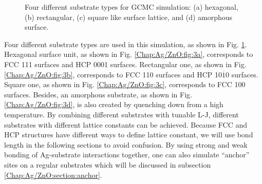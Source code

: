\begin{figure}[!ht]
  \label{Chap:Ag/ZnO:fig:3d}
\caption[Four different substrate types for GCMC simulation.]{Four different substrate types for GCMC simulation: (a) hexagonal, (b) rectangular, (c) square like surface lattice, and (d) amorphous surface. }
  \label{Chap:Ag/ZnO:fig3}
\end{figure}
\endgroup

Four different substrate types are used in this simulation, as shown in Fig. \ref{Chap:Ag/ZnO:fig3}. Hexagonal surface unit, as shown in Fig. \ref{Chap:Ag/ZnO:fig:3a}, corresponds to \ac{FCC} {111} surfaces and \ac{HCP} {0001} surfaces. Rectangular one, as shown in Fig. \ref{Chap:Ag/ZnO:fig:3b}, corresponds to \ac{FCC} {110} surfaces and \ac{HCP} {10$\overline{1}$0} surfaces. Square one, as shown in Fig. \ref{Chap:Ag/ZnO:fig:3c}, corresponds to \ac{FCC} {100} surfaces. Besides, an amorphous substrate, as shown in Fig. \ref{Chap:Ag/ZnO:fig:3d}, is also created by quenching down from a high temperature. By combining different substrates with tunable \ac{L-J}, different substrates with different lattice constants can be achieved. Because \ac{FCC} and \ac{HCP} structures have different ways to define lattice constant, we will use bond length in the following sections to avoid confusion. By using strong and weak bonding of Ag-substrate interactions together, one can also simulate ``anchor'' sites on a regular substrates which will be discussed in subsection \ref{Chap:Ag/ZnO:section:anchor}.